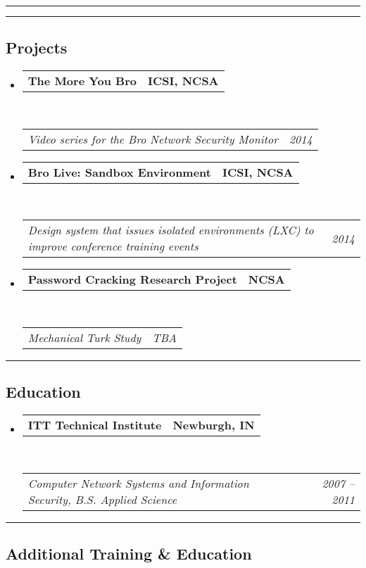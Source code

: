 \documentclass[10pt,letterpaper]{article}
\makeatletter
\newcommand{\headerrow}[2]
{\begin{tabular*}{\linewidth}{l@{\extracolsep{\fill}}r}
	#1 &
	#2 \\
\end{tabular*}}
\makeatother
\begin{document}
\hrule

\newpage

\hrule

\subsection*{Projects}

\begin{itemize}
	\parskip=0.1em

	\item
	\headerrow
		{\textbf{The More You Bro}}
		{\textbf{ICSI, NCSA}}
	\\
	\headerrow
		{\emph{Video series for the Bro Network Security Monitor}}
		{\emph{2014}}

	\item
	\headerrow
		{\textbf{Bro Live: Sandbox Environment}}
		{\textbf{ICSI, NCSA}}
	\\
	\headerrow
		{\emph{Design system that issues isolated environments (LXC) to improve conference training events}}
		{\emph{2014}}

	\item
	\headerrow
		{\textbf{Password Cracking Research Project}}
		{\textbf{NCSA}}
	\\
	\headerrow
		{\emph{Mechanical Turk Study}}
		{\emph{TBA}}
\end{itemize}

\hrule
\vspace{-0.4em}
\subsection*{Education}

\begin{itemize}
	\parskip=0.1em

	\item
	\headerrow
		{\textbf{ITT Technical Institute}}
		{\textbf{Newburgh, IN}}
	\\
	\headerrow
		{\emph{Computer Network Systems and Information Security, B.S. Applied Science}}
		{\emph{2007 -- 2011}}

\end{itemize}

\hrule
\vspace{-0.4em}

\subsection*{Additional Training \& Education}
\end{document}
